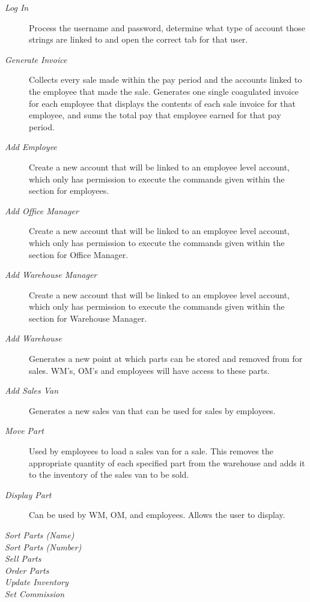\documentclass{report}
\begin{document}
\begin{description}
  \item [\textit{Log In}] Process the username and password, determine what type of account those strings are linked to and open the correct tab for that user.
  \item [\textit{Generate Invoice}] Collects every sale made within the pay period and the accounts linked to the employee that made the sale. Generates one single coagulated invoice for each employee that displays the contents of each sale invoice for that employee, and sums the total pay that employee earned for that pay period.
  \item [\textit{Add Employee}] Create a new account that will be linked to an employee level account, which only has permission to execute the commands given within the section for employees.
  \item [\textit{Add Office Manager}] Create a new account that will be linked to an employee level account, which only has permission to execute the commands given within the section for Office Manager.
  \item [\textit{Add Warehouse Manager}] Create a new account that will be linked to an employee level account, which only has permission to execute the commands given within the section for Warehouse Manager.
  \item [\textit{Add Warehouse}] Generates a new point at which parts can be stored and removed from for sales. WM’s, OM’s and employees will have access to these parts.
  \item [\textit{Add Sales Van}] Generates a new sales van that can be used for sales by employees.
  \item [\textit{Move Part}] Used by employees to load a sales van for a sale. This removes the appropriate quantity of each specified part from the warehouse and adds it to the inventory of the sales van to be sold.
  \item [\textit{Display Part}] Can be used by WM, OM, and employees. Allows the user to display.
  \item [\textit{Sort Parts (Name)}]
  \item [\textit{Sort Parts (Number)}]
  \item [\textit{Sell Parts}]
  \item [\textit{Order Parts}]
  \item [\textit{Update Inventory}]
  \item [\textit{Set Commission}]
\end{description}
\end{document}
